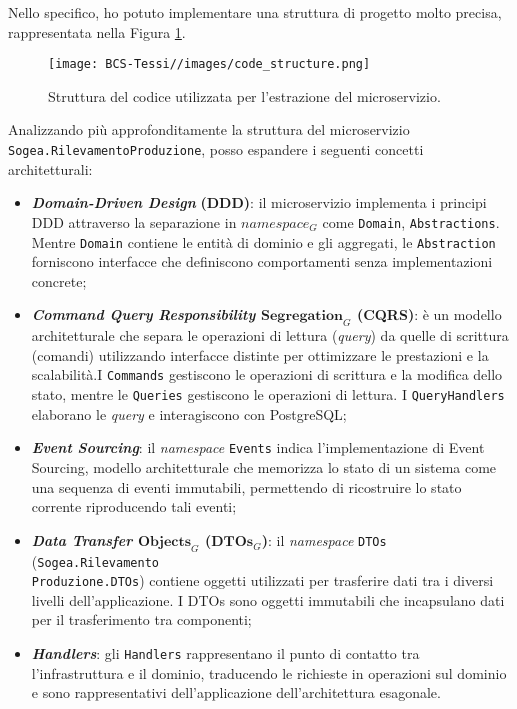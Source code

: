         \noindent Nello specifico, ho potuto implementare una struttura di progetto molto precisa, rappresentata nella Figura \ref{fig:code-structure}.

         
        \begin{figure}[H]
            \centering
            \texttt{[image: BCS-Tessi//images/code\_structure.png]}
            \caption{Struttura del codice utilizzata per l'estrazione del microservizio.}
            \label{fig:code-structure}
        \end{figure}

        \vspace{0.2 em}
        \noindent Analizzando più approfonditamente la struttura del microservizio \texttt{Sogea.Rilevamento}\texttt{Produzione}, posso espandere i seguenti concetti architetturali:
        \begin{itemize}
            \item \textbf{\textit{Domain-Driven Design}} \textbf{(DDD)}: il microservizio implementa i principi DDD attraverso la separazione in \textit{$namespace_G$} come \texttt{Domain}, \texttt{Abstractions}. Mentre \texttt{Domain} contiene le entità di dominio e gli aggregati, le \texttt{Abstraction} forniscono interfacce che definiscono comportamenti senza implementazioni concrete;
            \item \textbf{\textit{Command Query Responsibility $\textbf{Segregation}_G$} (CQRS)}: è un modello architetturale che separa le operazioni di lettura (\textit{query}) da quelle di scrittura (comandi) utilizzando interfacce distinte per ottimizzare le prestazioni e la scalabilità.I \texttt{Commands} gestiscono le operazioni di scrittura e la modifica dello stato, mentre le \texttt{Queries} gestiscono le operazioni di lettura. I \texttt{QueryHandlers} elaborano le \textit{query} e interagiscono con PostgreSQL;
            \item \textbf{\textit{Event Sourcing}}: il \textit{namespace} \texttt{Events} indica l'implementazione di Event Sourcing,  modello architetturale che memorizza lo stato di un sistema come una sequenza di eventi immutabili, permettendo di ricostruire lo stato corrente riproducendo tali eventi;
            \item \textbf{\textit{Data Transfer $\textbf{Objects}_G$} ($\textbf{DTOs}_G$)}: il \textit{namespace} \texttt{DTOs} (\texttt{Sogea.Rilevamento}\\ 
            \texttt{Produzione.DTOs}) contiene oggetti utilizzati per trasferire dati tra i diversi livelli dell'applicazione. I DTOs sono oggetti immutabili che incapsulano dati per il trasferimento tra componenti;
            \item \textbf{\textit{Handlers}}: gli \texttt{Handlers} rappresentano il punto di contatto tra l'infrastruttura e il dominio, traducendo le richieste in operazioni sul dominio e sono rappresentativi dell'applicazione dell'architettura esagonale.
        \end{itemize}


